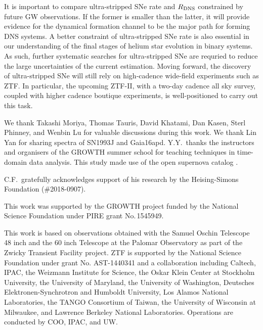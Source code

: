 \documentclass[twocolumn]{aastex63}
\begin{document}
It is important to compare ultra-stripped SNe rate and $R_{\rm DNS}$ constrained by future GW 
observations. If the former is smaller than the latter, it will provide evidence for the dynamical formation 
channel to be the major path for forming DNS systems. A better constraint of ultra-stripped SNe rate is 
also essential in our understanding of the final stages of helium star evolution in binary systems. As 
such, further systematic searches for ultra-stripped SNe are requried to reduce the large uncertainties 
of the current estimation. Moving forward, the discovery of ultra-stripped SNe will still rely on 
high-cadence wide-field experiments such as ZTF. In particular, the upcoming ZTF-II, with a two-day 
cadence all sky survey, coupled with higher cadence boutique experiments, is well-positioned to carry 
out this task.

\acknowledgements

We thank Takashi Moriya, Thomas Tauris, David Khatami, Dan Kasen, Sterl Phinney, and Wenbin 
Lu for valuable discussions during this work. We thank Lin Yan for sharing spectra 
of SN1993J and Gaia16apd. Y.Y.~thanks the instructors and organisers of the 
GROWTH summer school for teaching techniques in time-domain data analysis. 
This study made use of the open supernova catalog \citep{Guillochon2017}.

C.F.~gratefully acknowledges support of his research by the Heising-Simons Foundation 
(\#2018-0907).

This work was supported by the GROWTH project funded by the National Science Foundation under 
PIRE grant No.\,1545949. 

This work is based on observations obtained with the Samuel Oschin Telescope 48 inch and the 60 
inch Telescope at the Palomar Observatory as part of the Zwicky Transient Facility project. ZTF is 
supported by the National Science Foundation under grant No. AST-1440341 and a collaboration 
including Caltech, IPAC, the Weizmann Institute for Science, the Oskar Klein Center at Stockholm 
University, the University of Maryland, the University of Washington, Deutsches 
Elektronen-Synchrotron and Humboldt University, Los Alamos National Laboratories, the TANGO 
Consortium of Taiwan, the University of Wisconsin at Milwaukee, and Lawrence Berkeley National 
Laboratories. Operations are conducted by COO, IPAC, and UW. 

\end{document}
